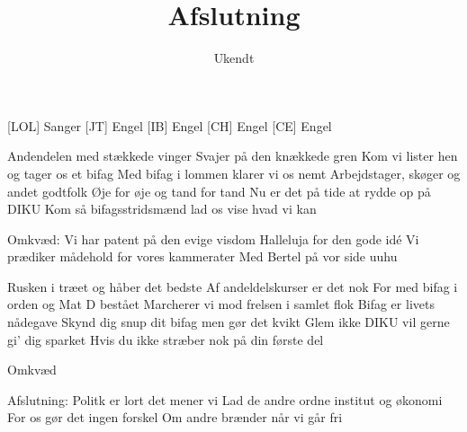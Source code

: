 \documentclass[a4paper,11pt]{article}
\title{Afslutning}
\author{Ukendt}
\begin{document}
\maketitle

\begin{roles}
[LOL] Sanger
[JT] Engel
[IB] Engel
[CH] Engel
[CE] Engel
\end{roles}


\begin{song}

Andendelen med stækkede vinger
Svajer på den knækkede gren
Kom vi lister hen og tager os et bifag
Med bifag i lommen klarer vi os nemt
Arbejdstager, skøger og andet godtfolk
Øje for øje og tand for tand
Nu er det på tide at rydde op på DIKU
Kom så bifagsstridsmænd lad os vise hvad vi kan

Omkvæd:
Vi har patent på den evige visdom
Halleluja for  den gode idé
Vi prædiker mådehold for vores kammerater
Med Bertel på vor side uuhu

Rusken i træet og håber det bedste
Af andeldelskurser er det nok
For med bifag i orden og Mat D bestået
Marcherer vi mod frelsen i samlet flok
Bifag er livets nådegave
Skynd dig snup dit bifag men gør det kvikt
Glem ikke DIKU vil gerne gi' dig sparket
Hvis du ikke stræber nok på din første del

Omkvæd

Afslutning:
Politk er lort det mener vi
Lad de andre ordne institut og økonomi
For os gør det ingen forskel
Om andre brænder når vi går fri

\end{song}
\end{document}
